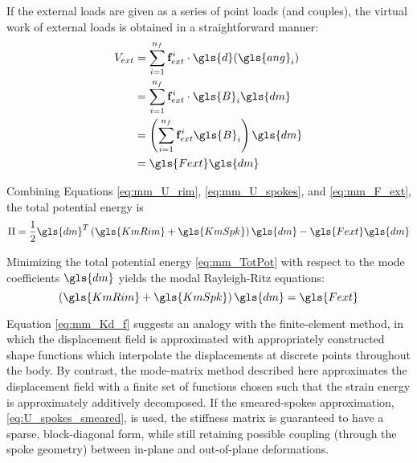 \documentclass[\rootdir/thesis.tex]{subfiles}
\begin{document}
If the external loads are given as a series of point loads (and couples), the virtual work of external loads is obtained in a straightforward manner:
\begin{align}
\label{eq:mm_F_ext}
\begin{split}
V_{ext} &= \sum_{i=1}^{n_f} \mathbf{f}_{ext}^i \cdot \gls{d}(\gls{ang}_i) \\
&= \sum_{i=1}^{n_f} \mathbf{f}_{ext}^i \cdot \gls{B}_i \gls{dm}\\
&= \left(\sum_{i=1}^{n_f} \mathbf{f}_{ext}^i \gls{B}_i \right) \gls{dm}\\
&= \gls{Fext}\gls{dm}
\end{split}
\end{align}

Combining Equations \eqref{eq:mm_U_rim}, \eqref{eq:mm_U_spokes}, and \eqref{eq:mm_F_ext}, the total potential energy is
\begin{equation}
\label{eq:mm_TotPot}
\Pi = \frac{1}{2} \gls{dm}^T \left( \gls{KmRim} + \gls{KmSpk} \right) \gls{dm} - \gls{Fext}\gls{dm}
\end{equation}

Minimizing the total potential energy \eqref{eq:mm_TotPot} with respect to the mode coefficients $\gls{dm}$ yields the modal Rayleigh-Ritz equations:
\begin{equation}
\label{eq:mm_Kd_f}
\left( \gls{KmRim} + \gls{KmSpk} \right) \gls{dm} = \gls{Fext}
\end{equation}

Equation \eqref{eq:mm_Kd_f} suggests an analogy with the finite-element method, in which the displacement field is approximated with appropriately constructed shape functions which interpolate the displacements at discrete points throughout the body. By contrast, the mode-matrix method described here approximates the displacement field with a finite set of functions chosen such that the strain energy is approximately additively decomposed. If the smeared-spokes approximation, \eqref{eq:U_spokes_smeared}, is used, the stiffness matrix is guaranteed to have a sparse, block-diagonal form, while still retaining possible coupling (through the spoke geometry) between in-plane and out-of-plane deformations.
\end{document}
